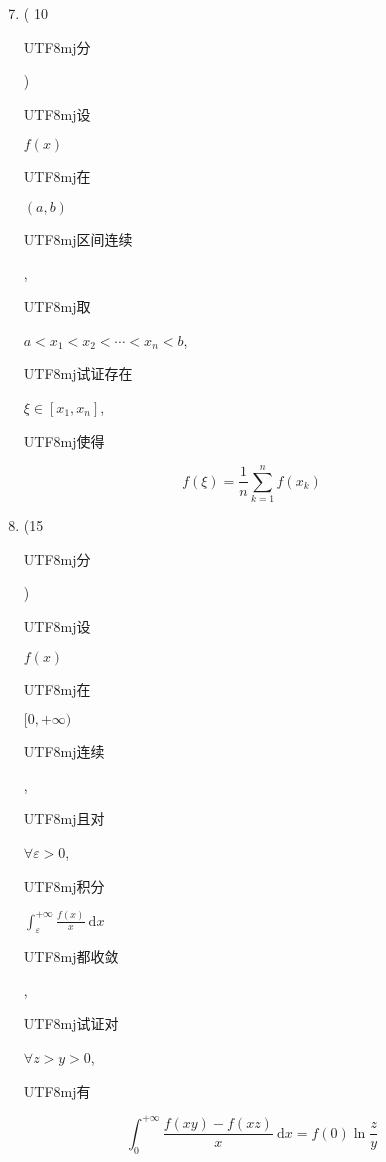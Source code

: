 \documentclass[10pt]{article}
\begin{document}
\begin{enumerate}
  \setcounter{enumi}{6}
  \item ( 10 \begin{CJK}{UTF8}{mj}分\end{CJK}) \begin{CJK}{UTF8}{mj}设\end{CJK} $f(x)$ \begin{CJK}{UTF8}{mj}在\end{CJK} $(a, b)$ \begin{CJK}{UTF8}{mj}区间连续\end{CJK}, \begin{CJK}{UTF8}{mj}取\end{CJK} $a<x_{1}<x_{2}<\cdots<x_{n}<b$, \begin{CJK}{UTF8}{mj}试证存在\end{CJK} $\xi \in\left[x_{1}, x_{n}\right]$, \begin{CJK}{UTF8}{mj}使得\end{CJK}
\end{enumerate}
$$
f(\xi)=\frac{1}{n} \sum_{k=1}^{n} f\left(x_{k}\right)
$$

\begin{enumerate}
  \setcounter{enumi}{7}
  \item (15 \begin{CJK}{UTF8}{mj}分\end{CJK}) \begin{CJK}{UTF8}{mj}设\end{CJK} $f(x)$ \begin{CJK}{UTF8}{mj}在\end{CJK} $[0,+\infty)$ \begin{CJK}{UTF8}{mj}连续\end{CJK}, \begin{CJK}{UTF8}{mj}且对\end{CJK} $\forall \varepsilon>0$, \begin{CJK}{UTF8}{mj}积分\end{CJK} $\int_{\varepsilon}^{+\infty} \frac{f(x)}{x} \mathrm{~d} x$ \begin{CJK}{UTF8}{mj}都收敛\end{CJK}, \begin{CJK}{UTF8}{mj}试证对\end{CJK} $\forall z>y>0$, \begin{CJK}{UTF8}{mj}有\end{CJK}
\end{enumerate}
$$
\int_{0}^{+\infty} \frac{f(x y)-f(x z)}{x} \mathrm{~d} x=f(0) \ln \frac{z}{y}
$$
\end{document}
